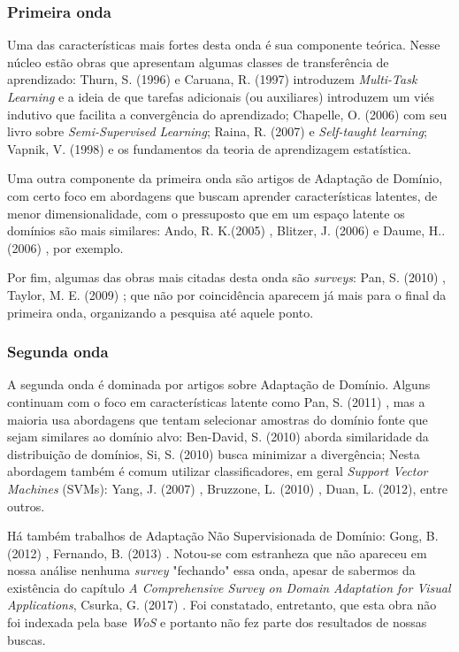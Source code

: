\documentclass[sigconf]{acmart}
\begin{document}
\subsubsection{Primeira onda}
Uma das características mais fortes desta onda é sua componente teórica. Nesse núcleo estão obras que apresentam algumas classes de transferência de aprendizado: Thurn, S. (1996) \cite{thrun1996learning} e Caruana, R. (1997) \cite{Caruana1997} introduzem \emph{Multi-Task Learning} e a ideia de que tarefas adicionais (ou auxiliares) introduzem um viés indutivo que facilita a convergência do aprendizado; Chapelle, O. (2006) \cite{Chapelle:2010:SL:1841234} com seu livro sobre \emph{Semi-Supervised Learning}; Raina, R. (2007) e \emph{Self-taught learning}; Vapnik, V. (1998) \cite{Vapnik1998} e os fundamentos da teoria de aprendizagem estatística.

Uma outra componente da primeira onda são artigos de Adaptação de Domínio, com certo foco em abordagens que buscam aprender características latentes, de menor dimensionalidade, com o pressuposto que em um espaço latente os domínios são mais similares: Ando, R. K.(2005) \cite{ando2005framework}, Blitzer, J. (2006) \cite{Blitzer:2006:DAS:1610075.1610094} e Daume, H.. (2006) \cite{DaumeIII2006}, por exemplo. 

Por fim, algumas das obras mais citadas desta onda são \emph{surveys}: Pan, S. (2010) \cite{PanYang}, Taylor, M. E. (2009) \cite{Taylor:2009:TLR:1577069.1755839}; que não por coincidência aparecem já mais para o final da primeira onda, organizando a pesquisa até aquele ponto. 

\subsubsection{Segunda onda}\label{segunda_onda}
A segunda onda é dominada por artigos sobre Adaptação de Domínio.  Alguns continuam com o foco em características latente como Pan, S. (2011) \cite{Pan2011}, mas a maioria usa abordagens que tentam selecionar amostras do domínio fonte que sejam similares ao domínio alvo: Ben-David, S. (2010) \cite{BenDavid2009} aborda similaridade da distribuição de domínios, Si, S. (2010) \cite{SiSi2010} busca minimizar a divergência; Nesta abordagem também é comum utilizar classificadores, em geral \emph{Support Vector Machines} (SVMs): Yang, J. (2007) \cite{Yang2007}, Bruzzone, L. (2010) \cite{Bruzzone2010}, Duan, L. (2012)\cite{LixinDuan2012}, entre outros.

Há também trabalhos de Adaptação Não Supervisionada de Domínio: Gong, B. (2012) \cite{BoqingGong2012}, Fernando, B. (2013) \cite{Fernando2013}.
Notou-se com estranheza que não apareceu em nossa análise nenhuma \emph{survey} "fechando" essa onda, apesar de sabermos da existência do capítulo \emph{A Comprehensive Survey on Domain Adaptation for Visual Applications}, Csurka, G. (2017) \cite{Csurka2017}. Foi constatado, entretanto, que esta obra não foi indexada pela base \emph{WoS} e portanto não fez parte dos resultados de nossas buscas. 
\end{document}
